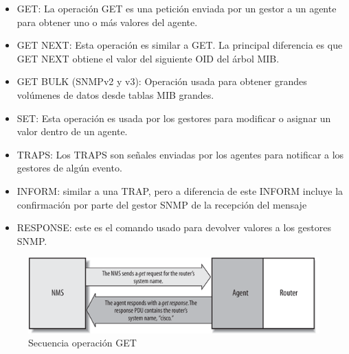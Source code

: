 \begin{itemize}
    \item GET: La operación GET es una petición enviada por un gestor a un agente para obtener uno o
    más valores del agente.
    \item GET NEXT: Esta operación es similar a GET. La principal diferencia es que GET NEXT obtiene
    el valor del siguiente OID del árbol MIB.
    \item GET BULK (SNMPv2 y v3): Operación usada para obtener grandes volúmenes de datos desde tablas
    MIB grandes.
    \item SET: Esta operación es usada por los gestores para modificar o asignar un valor dentro de un
    agente.
    \item TRAPS: Los TRAPS son señales enviadas por los agentes para notificar a los gestores de algún
    evento.
    \item INFORM: similar a una TRAP, pero a diferencia de este INFORM incluye la confirmación por
    parte del gestor SNMP de la recepción del mensaje
    \item RESPONSE: este es el comando usado para devolver valores a los gestores SNMP.
\end{itemize}

\begin{figure}
    \centering
    \includegraphics[width=.3\linewidth]{graphics/snmp_get}
    \caption{Secuencia operación GET}
    \label{fig:snmp_get}
\end{figure}